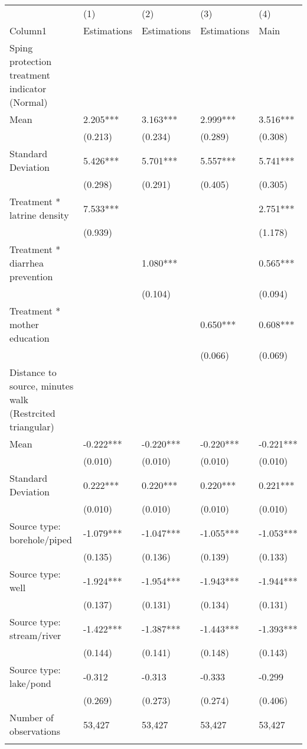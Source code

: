\begin{table}[tbp] \centering
{}

{\tiny
\begin{tabularx}{\textwidth}{lCCCC}

\toprule
&{(1)}&{(2)}&{(3)}&{(4)} \tabularnewline
{Column1}&{Estimations}&{Estimations}&{Estimations}&{Main} \tabularnewline
\midrule\addlinespace[1.5ex]
Sping protection treatment indicator (Normal)&&&& \tabularnewline
Mean&2.205***&3.163***&2.999***&3.516*** \tabularnewline
&(0.213)&(0.234)&(0.289)&(0.308) \tabularnewline
Standard Deviation&5.426***&5.701***&5.557***&5.741*** \tabularnewline
&(0.298)&(0.291)&(0.405)&(0.305) \tabularnewline
Treatment * latrine density&7.533***&&&2.751*** \tabularnewline
&(0.939)&&&(1.178) \tabularnewline
Treatment * diarrhea prevention&&1.080***&&0.565*** \tabularnewline
&&(0.104)&&(0.094) \tabularnewline
Treatment * mother education&&&0.650***&0.608*** \tabularnewline
&&&(0.066)&(0.069) \tabularnewline
Distance to source, minutes walk (Restrcited triangular)&&&& \tabularnewline
Mean&-0.222***&-0.220***&-0.220***&-0.221*** \tabularnewline
&(0.010)&(0.010)&(0.010)&(0.010) \tabularnewline
Standard Deviation&0.222***&0.220***&0.220***&0.221*** \tabularnewline
&(0.010)&(0.010)&(0.010)&(0.010) \tabularnewline
Source type: borehole/piped&-1.079***&-1.047***&-1.055***&-1.053*** \tabularnewline
&(0.135)&(0.136)&(0.139)&(0.133) \tabularnewline
Source type: well&-1.924***&-1.954***&-1.943***&-1.944*** \tabularnewline
&(0.137)&(0.131)&(0.134)&(0.131) \tabularnewline
Source type: stream/river&-1.422***&-1.387***&-1.443***&-1.393*** \tabularnewline
&(0.144)&(0.141)&(0.148)&(0.143) \tabularnewline
Source type: lake/pond&-0.312&-0.313&-0.333&-0.299 \tabularnewline
&(0.269)&(0.273)&(0.274)&(0.406) \tabularnewline
\midrule \midrule Number of observations&53,427&53,427&53,427&53,427 \tabularnewline
\bottomrule \addlinespace[1.5ex]

\end{tabularx}
}
\end{table}
